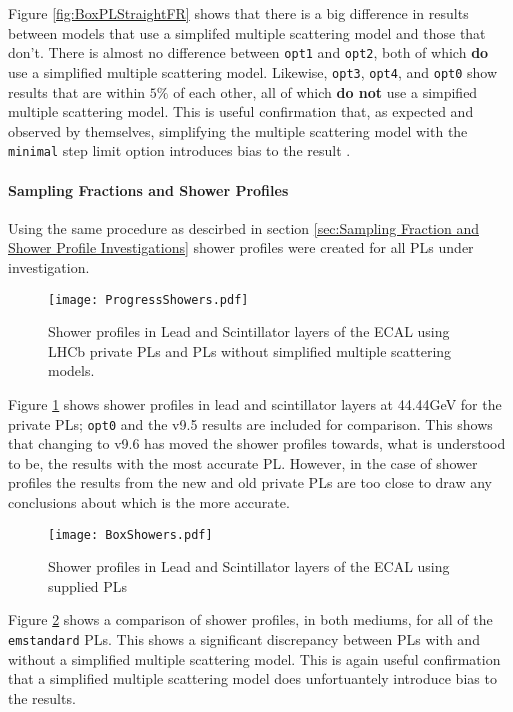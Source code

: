 Figure \ref{fig:BoxPLStraightFR} shows that there is a big difference in results between models that use a simplifed multiple scattering model and those that don't.  There is almost no difference between \texttt{opt1} and \texttt{opt2}, both of which \textbf{do} use a simplified multiple scattering model.  Likewise, \texttt{opt3}, \texttt{opt4}, and \texttt{opt0} show results that are within $5\%$ of each other, all of which \textbf{do not} use a simpified multiple scattering model.  This is useful confirmation that, as expected and observed by \geant themselves, simplifying the multiple scattering model with the \texttt{minimal} step limit option introduces bias to the result \cite{1742-6596-219-3-032045}.

\paragraph{Sampling Fractions and Shower Profiles} 
Using the same procedure as descirbed in section \ref{sec:Sampling Fraction and Shower Profile Investigations} shower profiles were created for all PLs under investigation.  
\begin{figure}[h]
  \centering
  \texttt{[image: ProgressShowers.pdf]}
  \caption{Shower profiles in Lead and Scintillator layers of the ECAL using LHCb private PLs and \geant PLs without simplified multiple scattering models.}
  \label{fig:LHCbPLShowers}
\end{figure}

Figure \ref{fig:LHCbPLShowers} shows shower profiles in lead and scintillator layers at 44.44GeV for the \lhcb private PLs; \texttt{opt0} and the v9.5 results are included for comparison.  This shows that changing to \geant v9.6 has moved the shower profiles towards, what is understood to be, the results with the most accurate PL.  However, in the case of shower profiles the results from the new and old \lhcb private PLs are too close to draw any conclusions about which is the more accurate.

\begin{figure}[h]
  \centering
  \texttt{[image: BoxShowers.pdf]}
  \caption{Shower profiles in Lead and Scintillator layers of the ECAL using \geant supplied PLs}
  \label{fig:BoxPLShowers}
\end{figure}

Figure \ref{fig:BoxPLShowers} shows a comparison of shower profiles, in both mediums, for all of the \texttt{emstandard} PLs.  This shows a significant discrepancy between PLs with and without a simplified multiple scattering model.  This is again useful confirmation that a simplified multiple scattering model does unfortuantely introduce bias to the results.


